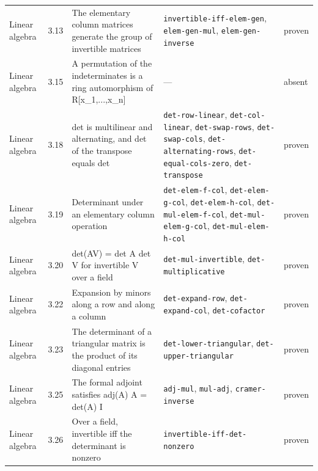 \begin{longtable}{@{}ll>{\raggedright\arraybackslash}p{4.2cm}>{\raggedright\arraybackslash}p{4.2cm}l@{}}
Linear algebra & 3.13 & The elementary column matrices generate the group of invertible matrices & \texttt{invertible-\allowbreak{}iff-\allowbreak{}elem-\allowbreak{}gen}, \texttt{elem-\allowbreak{}gen-\allowbreak{}mul}, \texttt{elem-\allowbreak{}gen-\allowbreak{}inverse} & proven \\
Linear algebra & 3.15 & A permutation of the indeterminates is a ring automorphism of R[x\_1,...,x\_n] & --- & absent \\
Linear algebra & 3.18 & det is multilinear and alternating, and det of the transpose equals det & \texttt{det-\allowbreak{}row-\allowbreak{}linear}, \texttt{det-\allowbreak{}col-\allowbreak{}linear}, \texttt{det-\allowbreak{}swap-\allowbreak{}rows}, \texttt{det-\allowbreak{}swap-\allowbreak{}cols}, \texttt{det-\allowbreak{}alternating-\allowbreak{}rows}, \texttt{det-\allowbreak{}equal-\allowbreak{}cols-\allowbreak{}zero}, \texttt{det-\allowbreak{}transpose} & proven \\
Linear algebra & 3.19 & Determinant under an elementary column operation & \texttt{det-\allowbreak{}elem-\allowbreak{}f-\allowbreak{}col}, \texttt{det-\allowbreak{}elem-\allowbreak{}g-\allowbreak{}col}, \texttt{det-\allowbreak{}elem-\allowbreak{}h-\allowbreak{}col}, \texttt{det-\allowbreak{}mul-\allowbreak{}elem-\allowbreak{}f-\allowbreak{}col}, \texttt{det-\allowbreak{}mul-\allowbreak{}elem-\allowbreak{}g-\allowbreak{}col}, \texttt{det-\allowbreak{}mul-\allowbreak{}elem-\allowbreak{}h-\allowbreak{}col} & proven \\
Linear algebra & 3.20 & det(AV) = det A det V for invertible V over a field & \texttt{det-\allowbreak{}mul-\allowbreak{}invertible}, \texttt{det-\allowbreak{}multiplicative} & proven \\
Linear algebra & 3.22 & Expansion by minors along a row and along a column & \texttt{det-\allowbreak{}expand-\allowbreak{}row}, \texttt{det-\allowbreak{}expand-\allowbreak{}col}, \texttt{det-\allowbreak{}cofactor} & proven \\
Linear algebra & 3.23 & The determinant of a triangular matrix is the product of its diagonal entries & \texttt{det-\allowbreak{}lower-\allowbreak{}triangular}, \texttt{det-\allowbreak{}upper-\allowbreak{}triangular} & proven \\
Linear algebra & 3.25 & The formal adjoint satisfies adj(A) A = det(A) I & \texttt{adj-\allowbreak{}mul}, \texttt{mul-\allowbreak{}adj}, \texttt{cramer-\allowbreak{}inverse} & proven \\
Linear algebra & 3.26 & Over a field, invertible iff the determinant is nonzero & \texttt{invertible-\allowbreak{}iff-\allowbreak{}det-\allowbreak{}nonzero} & proven \\

\end{longtable}
